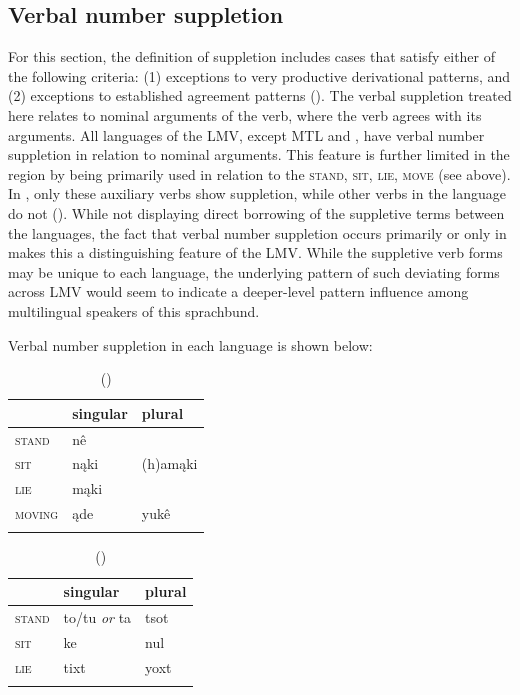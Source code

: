 \documentclass[output=paper]{LSP/langsci}
\begin{document}
\subsection{Verbal number suppletion}

	For this section, the definition of suppletion includes cases that satisfy either of the following criteria: (1) exceptions to very productive derivational patterns, and (2) exceptions to established agreement patterns (\citealt[3]{Veselinova2003}). The verbal suppletion treated here relates to nominal arguments of the verb, where the verb agrees with its arguments. All languages of the LMV, except MTL and , have verbal number suppletion in relation to nominal arguments. This feature is further limited in the region by being primarily used in relation to the  \textsc{stand}, \textsc{sit}, \textsc{lie}, \textsc{move} (see above). In , only these auxiliary verbs show suppletion, while other verbs in the language do not (\citealt[40]{Haas1946}). While not displaying direct borrowing of the suppletive terms between the languages, the fact that verbal number suppletion occurs primarily or only in  makes this a distinguishing feature of the LMV. While the suppletive verb forms may be unique to each language, the underlying pattern of such deviating forms across LMV  would seem to indicate a deeper-level pattern influence among multilingual speakers of this sprachbund.

	Verbal number suppletion in each language is shown below:

\begin{table}
\caption{ (\citealt[3]{DorseySwanton1912})}
\begin{tabularx}{.5\textwidth}{XXX}
\lsptoprule
& singular & plural \\
\midrule
\textsc{stand} & nê & \\
\textsc{sit} & nąki & (h)amąki \\
 \textsc{lie} & mąki & \\ 
 \textsc{moving} & ąde & yukê \\
 \lspbottomrule
\end{tabularx}
\end{table}
\footnotetext{}

\begin{table}
\caption{ (\citealt[3]{GatschetSwanton1932})}
\begin{tabularx}{.5\textwidth}{XXX }
\lsptoprule
& singular & plural \\
\midrule
\textsc{stand} & to/tu \emph{or} ta & tsot \\
\textsc{sit} & ke & nul \\
\textsc{lie} & tixt & yoxt \\
\lspbottomrule
\end{tabularx} 
\end{table}
\end{document}
